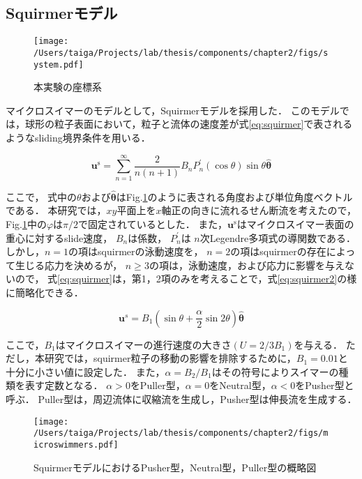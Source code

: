 \subsection{Squirmerモデル}
    \begin{figure}[htbp]
        \centering
        \texttt{[image: /Users/taiga/Projects/lab/thesis/components/chapter2/figs/system.pdf]}
        \caption{本実験の座標系}
        \label{fig:system}
    \end{figure}

マイクロスイマーのモデルとして，Squirmerモデル\cite{squirmer}を採用した．
このモデルでは，球形の粒子表面において，粒子と流体の速度差が式\eqref{eq:squirmer}で表されるようなsliding境界条件を用いる．

    \begin{equation}
        \boldsymbol{u}^\mathrm{s} = 
            \sum_{n=1}^\infty\frac{2}{n(n + 1)} B_n P_n^\prime(\cos{\theta}) \sin{\theta} \hat{\boldsymbol{\theta}}
        \label{eq:squirmer}
    \end{equation}

\noindent
ここで， 式中の$\theta$および$\boldsymbol{\hat{\theta}}$はFig.\ref{fig:system}のように表される角度および単位角度ベクトルである．
本研究では，$xy$平面上を$x$軸正の向きに流れるせん断流を考えたので，
Fig.\ref{fig:system}中の$\varphi$は$\pi / 2$で固定されているとした．
また，$\boldsymbol{u}^\mathrm{s}$はマイクロスイマー表面の重心に対するslide速度，
$B_n$は係数，
$P^\prime_n$は $n$次Legendre多項式の導関数である．
しかし，$n=1$の項はsquirmerの泳動速度を，
$n=2$の項はsquirmerの存在によって生じる応力を決めるが，
$n \geq 3$の項は，泳動速度，および応力に影響を与えないので，
式\eqref{eq:squirmer}は，第1，2項のみを考えることで，式\eqref{eq:squirmer2}の様に簡略化できる．

    \begin{equation}
        \boldsymbol{u}^s =
            B_1 \left( \sin{\theta} + \frac{\alpha}{2} \sin{2\theta} \right) \hat{\boldsymbol{\theta}}
        \label{eq:squirmer2}
    \end{equation}

\noindent
ここで，$B_1$はマイクロスイマーの進行速度の大きさ$(U = 2/3 B_1)$を与える．
ただし，本研究では，squirmer粒子の移動の影響を排除するために，$B_1 = 0.01$と十分に小さい値に設定した．
また，$\alpha = B_2/B_1$はその符号によりスイマーの種類を表す定数となる．
$\alpha > 0$をPuller型，$\alpha = 0$をNeutral型，$\alpha < 0$をPusher型と呼ぶ．
Puller型は，周辺流体に収縮流を生成し，Pusher型は伸長流を生成する．

    \begin{figure}[H]
        \centering
        \texttt{[image: /Users/taiga/Projects/lab/thesis/components/chapter2/figs/microswimmers.pdf]}
        \caption{SquirmerモデルにおけるPusher型，Neutral型，Puller型の概略図}
        \label{fig:squirmermodel}
    \end{figure}
